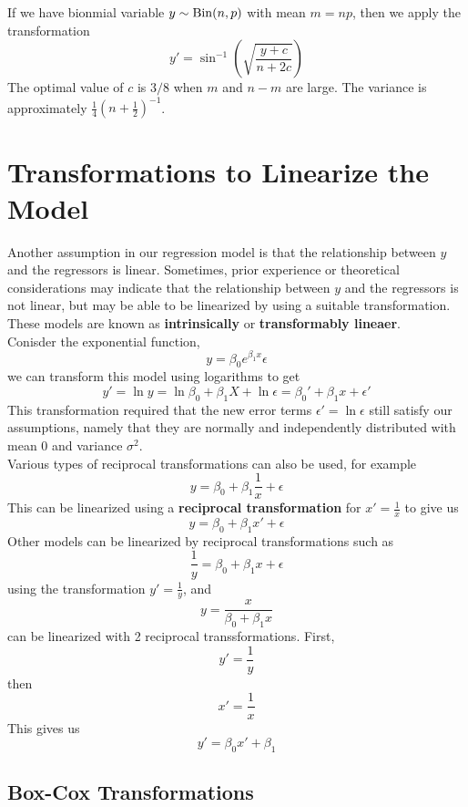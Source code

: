 If we have bionmial variable $y \sim \operatorname{Bin}(n,p)$ with mean $m = np$, then we apply the transformation 
\[y' = \sin^{-1}\left(\sqrt{\frac{y + c}{n + 2c}}\right)\]
The optimal value of $c$ is $3/8$ when $m$ and $n-m$ are large. The variance is approximately $\frac{1}{4}\left(n+\frac{1}{2}\right)^{-1}$.

\section{Transformations to Linearize the Model}

Another assumption in our regression model is that the relationship between $y$ and the regressors is linear. Sometimes, prior experience or theoretical considerations may indicate that the relationship between $y$ and the regressors is not linear, but may be able to be linearized by using a suitable transformation. These models are known as \textbf{intrinsically} or \textbf{transformably lineaer}.\\[1ex]
\indent
Conisder the exponential function, 
\[y = \beta_0e^{\beta_1x}\epsilon\]
we can transform this model using logarithms to get 
\[y' = \ln y = \ln \beta_0 + \beta_1X + \ln \epsilon = \beta_0' + \beta_1x + \epsilon'\]
This transformation required that the new error terms $\epsilon' = \ln \epsilon$ still satisfy our assumptions, namely that they are normally and independently distributed with mean 0 and variance $\sigma^2$. \\ 
\noindent
Various types of reciprocal transformations can also be used, for example 
\[y = \beta_0 + \beta_1\frac{1}{x}+\epsilon\]
This can be linearized using a \textbf{reciprocal transformation} for $x' = \frac{1}{x}$ to give us  
\[y = \beta_0 + \beta_1x' + \epsilon\]
Other models can be linearized by reciprocal transformations such as 
\[\frac{1}{y} = \beta_0 + \beta_1x + \epsilon\]
using the transformation $y' = \frac{1}{y}$, and 
\[y = \frac{x}{\beta_0 + \beta_1x}\]
can be linearized with 2 reciprocal transsformations. First, 
\[y' = \frac{1}{y}\]
then 
\[x' = \frac{1}{x}\]
This gives us 
\[y'= \beta_0x' + \beta_1\]

\subsection{Box-Cox Transformations}

